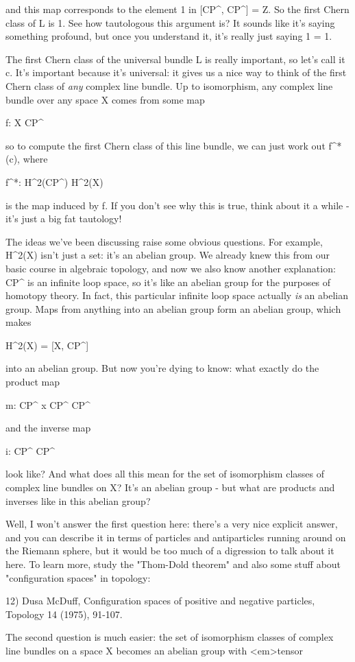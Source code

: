 and this map corresponds to the element 1 in [CP^{\infty }, CP^{\infty }]
= Z. So the first Chern class of L is 1.  See how tautologous this 
argument is?   It sounds like it's saying something profound, but once
you understand it, it's really just saying 1 = 1.

The first Chern class of the universal bundle L is really important, 
so let's call it c.  It's important because it's universal: it gives 
us a nice way to think of the first Chern class of \emph{any} complex line 
bundle.    Up to isomorphism, any complex line bundle over any space 
X comes from some map 

f: X \to  CP^{\infty }

so to compute the first Chern class of this line bundle, we can just
work out f^{*}(c), where

f^{*}: H^{2}(CP^{\infty }) \to  H^{2}(X)

is the map induced by f.  If you don't see why this is true, think about 
it a while - it's just a big fat tautology!   

The ideas we've been discussing raise some obvious questions.  For
example, H^{2}(X) isn't just a set: it's an abelian group.   We already
knew this from our basic course in algebraic topology, and now we also
know another explanation: CP^{\infty } is an infinite loop space, 
so it's like an abelian group for the purposes of homotopy theory.  In 
fact, this particular infinite loop space actually \emph{is} 
an abelian group.  
Maps from anything into an abelian group form an abelian group, which makes 

H^{2}(X) = [X, CP^{\infty }] 

into an abelian group.    But now you're dying to know: what exactly do 
the product map

m: CP^{\infty } x CP^{\infty } \to  CP^{\infty } 

and the inverse map

i: CP^{\infty } \to  CP^{\infty } 

look like?  And what does all this mean for the set of isomorphism 
classes of complex line bundles on X?  It's an abelian group - but 
what are products and inverses like in this abelian group?

Well, I won't answer the first question here: there's a very nice 
explicit answer, and you can describe it in terms of particles and 
antiparticles running around on the Riemann sphere, but it would be 
too much of a digression to talk about it here.  To learn more, 
study the "Thom-Dold theorem" and also some stuff about "configuration 
spaces" in topology:

12) Dusa McDuff, Configuration spaces of positive and negative particles,
Topology 14 (1975), 91-107.

The second question is much easier: the set of isomorphism classes of 
complex line bundles on a space X becomes an abelian group with <em>tensor


